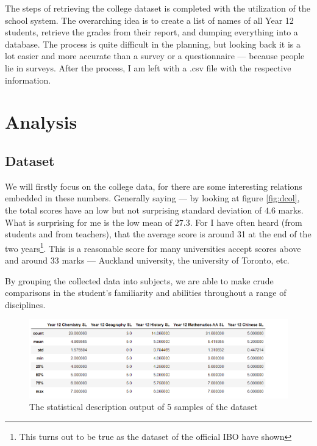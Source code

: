 \documentclass[a4paper,12pt]{tufte-handout}
\begin{document}
The steps of retrieving the college dataset is completed with the utilization of the school system. The overarching idea is to create a list of names of all Year 12 students, retrieve the grades from their report, and dumping everything into a database. The process is quite difficult in the planning, but looking back it is a lot easier and more accurate than a survey or a questionnaire --- because people lie in surveys. After the process, I am left with a .csv file with the respective information.

\section{Analysis}
\subsection{Dataset}

We will firstly focus on the college data, for there are some interesting relations embedded in these numbers. Generally saying --- by looking at figure \ref{fig:dcol}, the total scores have an low but not surprising standard deviation of $4.6$ marks. What is surprising for me is the low mean of $27.3$. For I have often heard (from students and from teachers), that the average score is around 31 at the end of the two years\footnote{This turns out to be true as the dataset of the official IBO have shown}. This is a reasonable score for many universities accept scores above and around 33 marks --- Auckland university, the university of Toronto, etc.

By grouping the collected data into subjects, we are able to make crude comparisons in the student's familiarity and abilities throughout a range of disciplines.

\begin{figure}
    \centering
    \includegraphics[width=\textwidth]{assets/col_sample.png}
    \caption{The statistical description output of 5 samples of the dataset}
    \label{fig:colsample}
\end{figure}
\end{document}
